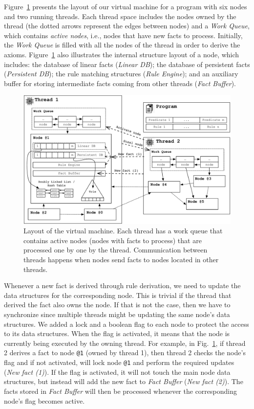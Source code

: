 Figure~\ref{fig:implementation:vm_overview} presents the layout of our virtual
machine for a program with six nodes and two running threads. Each thread space
includes the nodes owned by the thread (the dotted arrows represent the edges
between nodes) and a \emph{Work Queue}, which contains \emph{active nodes},
i.e., nodes that have new facts to process. Initially, the \emph{Work Queue} is
filled with all the nodes of the thread in order to derive the axioms.
Figure~\ref{fig:implementation:vm_overview} also illustrates the internal
structure layout of a node, which includes: the database of linear facts
(\emph{Linear DB}); the database of persistent facts (\emph{Persistent DB}); the
rule matching structures (\emph{Rule Engine}); and an auxiliary buffer for
storing intermediate facts coming from other threads (\emph{Fact Buffer}).

\begin{figure}[t]
\centering
\includegraphics[width=\textwidth]{figures/implementation/vm_overview.pdf}
\caption{Layout of the virtual machine. Each thread has a work queue that
   contains active nodes (nodes with facts to process) that are processed one
   by one by the thread. Communication between threads happens when nodes
   send facts to nodes located in other threads.}
\label{fig:implementation:vm_overview}
\end{figure}

Whenever a new fact is derived through rule derivation, we need to update the
data structures for the corresponding node. This is trivial if the thread that
derived the fact also owns the node. If that is not the case, then we have to
synchronize since multiple threads might be updating the same node's data
structures. We added a lock and a boolean flag to each node to protect the
access to its data structures. When the flag is activated, it means that the
node is currently being executed by the owning thread. For example, in
Fig.~\ref{fig:implementation:vm_overview}, if thread 2 derives a fact to node
\texttt{@1} (owned by thread 1), then thread 2 checks the node's flag and if not
activated, will lock node \texttt{@1} and perform the required updates
(\emph{New fact (1)}). If the flag is activated, it will not touch the main node
data structures, but instead will add the new fact to \emph{Fact Buffer}
(\emph{New fact (2)}). The facts stored in \emph{Fact Buffer} will then be
processed whenever the corresponding node's flag becomes active.

